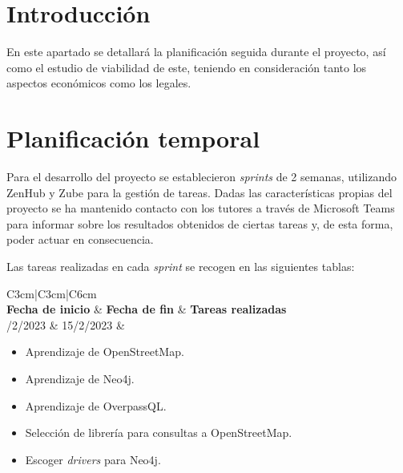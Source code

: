 
\section{Introducción}
En este apartado se detallará la planificación seguida durante el proyecto, así como el estudio de viabilidad de este, teniendo en consideración tanto los aspectos económicos como los legales.
\section{Planificación temporal}

Para el desarrollo del proyecto se establecieron \textit{sprints} de 2 semanas, utilizando ZenHub y Zube para la gestión de tareas. Dadas las características propias del proyecto se ha mantenido contacto con los tutores a través de Microsoft Teams para informar sobre los resultados obtenidos de ciertas tareas y, de esta forma, poder actuar en consecuencia.

Las tareas realizadas en cada \textit{sprint} se recogen en las siguientes tablas:




\begin{table}[h!]
	\centering
	\begin{tabular}{C{3cm}|C{3cm}|C{6cm}} 
			\\
			\midrule
			\textbf{Fecha de inicio} & \textbf{Fecha de fin} & \textbf{Tareas realizadas}\\
			/2/2023 & 15/2/2023 & \begin{itemize}[left=0pt]
					\item Aprendizaje de OpenStreetMap.
					\item Aprendizaje de Neo4j.
					\item Aprendizaje de OverpassQL.
					\item Selección de librería para consultas a OpenStreetMap.
					\item Escoger \textit{drivers} para Neo4j.
				\end{itemize}\tabularnewline
			\bottomrule
		\end{tabular}
	\caption{Tabla del \textit{sprint} 1}
	\label{tabsprint1}
\end{table}

